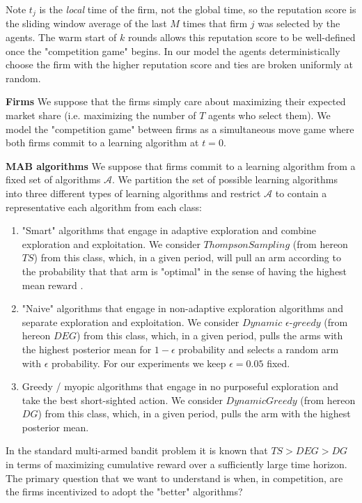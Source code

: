 \documentclass{article}
\theoremstyle{definition}
\begin{document}
Note $t_j$ is the \textit{local} time of the firm, not the global time, so the reputation score is the sliding window average of the last $M$ times that firm $j$ was selected by the agents. The warm start of $k$ rounds allows this reputation score to be well-defined once the "competition game" begins. In our model the agents deterministically choose the firm with the higher reputation score and ties are broken uniformly at random.

\noindent \textbf{Firms} We suppose that the firms simply care about maximizing their expected market share (i.e. maximizing the number of $T$ agents who select them). We model the "competition game" between firms as a simultaneous move game where both firms commit to a learning algorithm at $t = 0$.

\noindent \textbf{MAB algorithms} We suppose that firms commit to a learning algorithm from a fixed set of algorithms $\mathcal{A}$. We partition the set of possible learning algorithms into three different types of learning algorithms and restrict $\mathcal{A}$ to contain a representative each algorithm from each class:
\begin{enumerate}
\item "Smart" algorithms that engage in adaptive exploration and combine exploration and exploitation. We consider $Thompson Sampling$ (from hereon $TS$) from this class, which, in a given period, will pull an arm according to the probability that that arm is "optimal" in the sense of having the highest mean reward \citep{agrawal2012analysis}.
\item "Naive" algorithms that engage in non-adaptive exploration algorithms and separate exploration and exploitation. We consider $Dynamic$ $\epsilon$-$greedy$ (from hereon $DEG$) from this class, which, in a given period, pulls the arms with the highest posterior mean for $1 - \epsilon$ probability and selects a random arm with $\epsilon$ probability. For our experiments we keep $\epsilon = 0.05$ fixed.
\item Greedy / myopic algorithms that engage in no purposeful exploration and take the best short-sighted action. We consider $DynamicGreedy$ (from hereon $DG$) from this class, which, in a given period, pulls the arm with the highest posterior mean.
\end{enumerate}

In the standard multi-armed bandit problem it is known that $TS > DEG > DG$ in terms of maximizing cumulative reward over a sufficiently large time horizon. The primary question that we want to understand is when, in competition, are the firms incentivized to adopt the "better" algorithms?
\end{document}
